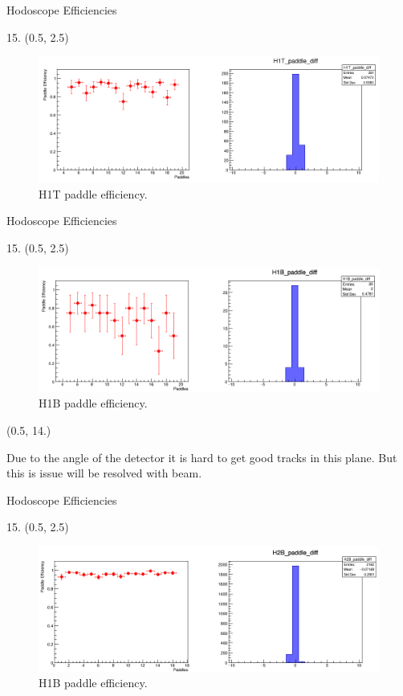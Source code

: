 \documentclass[12pt, xcolor={dvipsnames}, aspectratio = 169, sans,mathserif]{beamer}
\newenvironment{List}[2]
{
\begin{textblock}{#1}#2
\begin{itemize}
}
{
\end{itemize}
\end{textblock}
}
\newenvironment{Pic}[2]
{
\begin{textblock}{#1} #2
\begin{figure}
}
{
\end{figure}
\end{textblock}
}
\begin{document}
\begin{frame}{Hodoscope Efficiencies}
\begin{Pic}{15.}{(0.5, 2.5)}
  \includegraphics[width=15.0cm]{imgs/H1T_paddle_diff.png}
  \caption{H1T paddle efficiency.}
\end{Pic}
\end{frame}

\begin{frame}{Hodoscope Efficiencies}
\begin{Pic}{15.}{(0.5, 2.5)}
  \includegraphics[width=15.0cm]{imgs/H1B_paddle_diff.png}
  \caption{H1B paddle efficiency.}
\end{Pic}

\begin{List}{15.0}{(0.5, 14.)}
  \item Due to the angle of the detector it is hard to get good tracks in this plane. But this is issue will be resolved with beam.
\end{List}
\end{frame}

\begin{frame}{Hodoscope Efficiencies}
\begin{Pic}{15.}{(0.5, 2.5)}
  \includegraphics[width=15.0cm]{imgs/H2B_paddle_diff.png}
  \caption{H1B paddle efficiency.}
\end{Pic}
\end{frame}
\end{document}

